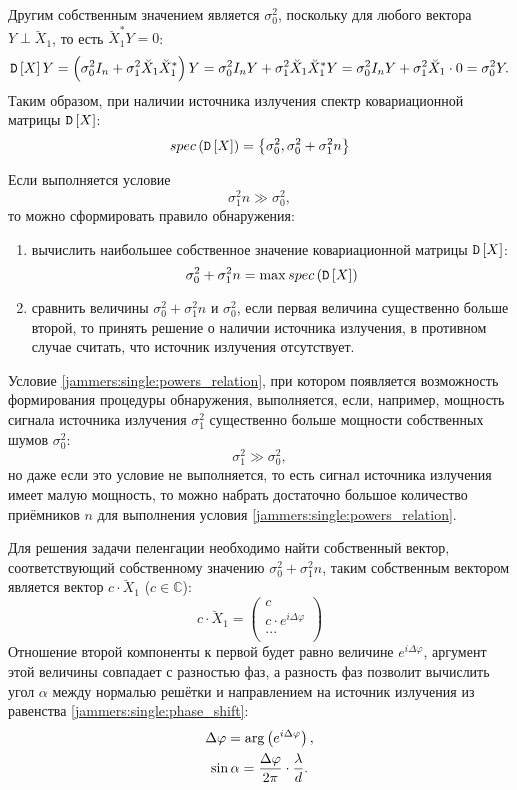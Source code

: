 Другим собственным значением является $\sigma_0^2$, поскольку для любого вектора $Y \perp \breve{X}_1$, то есть $\breve{X}_1^* Y = 0$:
\[
    \mathtt{D} \left [ X \right ] Y
    = \left ( \sigma_0^2 I_n + \sigma_1^2 \breve{X}_1 \breve{X}_1^* \right ) Y
    = \sigma_0^2 I_n Y + \sigma_1^2 \breve{X}_1 \breve{X}_1^* Y
    = \sigma_0^2 I_n Y + \sigma_1^2 \breve{X}_1 \cdot 0
    = \sigma_0^2 Y .
\]
Таким образом, при наличии источника излучения спектр ковариационной матрицы $\mathtt{D} \left [ X \right ]$:
\[
    spec \left ( \mathtt{D} \left [ X \right ] \right ) = \left \{ \sigma_0^2, \sigma_0^2 + \sigma_1^2 n \right \}
\]

Если выполняется условие
\begin{equation}
    \label{jammers:single:powers_relation}
    \sigma_1^2 n \gg \sigma_0^2 ,
\end{equation}
то можно сформировать правило обнаружения:
\begin{enumerate}
    \item вычислить наибольшее собственное значение ковариационной матрицы $\mathtt{D} \left [ X \right ]$:
    \[
        \sigma_0^2 + \sigma_1^2 n = \max spec \left ( \mathtt{D} \left [ X \right ] \right )
    \]
    \item сравнить величины $\sigma_0^2 + \sigma_1^2 n$ и $\sigma_0^2$, если первая величина существенно больше второй, то принять решение о наличии источника
    излучения, в противном случае считать, что источник излучения отсутствует.
\end{enumerate}

Условие \eqref{jammers:single:powers_relation}, при котором появляется возможность формирования процедуры обнаружения, выполняется, если, например, мощность
сигнала источника излучения $\sigma_1^2$ существенно больше мощности собственных шумов $\sigma_0^2$:
\[
    \sigma_1^2 \gg \sigma_0^2 ,
\]
но даже если это условие не выполняется, то есть сигнал источника излучения имеет малую мощность, то можно набрать достаточно большое количество приёмников $n$
для выполнения условия \eqref{jammers:single:powers_relation}.

Для решения задачи пеленгации необходимо найти собственный вектор, соответствующий собственному значению $\sigma_0^2 + \sigma_1^2 n$, таким собственным вектором
является вектор $c \cdot \breve{X}_1$ ($c \in \mathbb{C}$):
\[
    c \cdot \breve{X}_1
    = \begin{pmatrix}
          c \\
          c \cdot e^{i \Delta \varphi} \\
          ... \\
    \end{pmatrix}
\]
Отношение второй компоненты к первой будет равно величине $e^{i \Delta \varphi}$, аргумент этой величины совпадает с разностью фаз, а разность фаз позволит вычислить угол $\alpha$
между нормалью решётки и направлением на источник излучения из равенства \eqref{jammers:single:phase_shift}:
\begin{gather}
    \Delta \varphi = \arg \left ( e^{i \Delta \varphi} \right ), \notag \\
    \sin \alpha = \frac{\Delta \varphi}{2 \pi} \cdot \frac{\lambda}{d} \label{jammers:single:angle}.
\end{gather}

